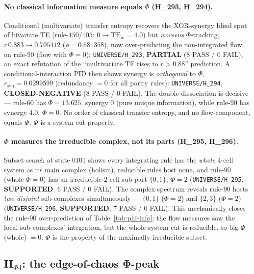 \paragraph{No classical information measure equals $\Phi$ (H\_293, H\_294).}
Conditional (multivariate) transfer entropy recovers the XOR-synergy blind spot of
bivariate TE (rule-$150$/$105$: $0\rightarrow\mathrm{TE_m}{=}4.0$) but \emph{worsens}
$\Phi$-tracking, $r\,0.883\rightarrow0.705412$ ($\rho{=}0.681358$), now over-predicting
the non-integrated flow on rule-$90$ (flow with $\Phi{=}0$): \texttt{UNIVERSE/H\_293},
\textbf{PARTIAL} ($8$ PASS / $0$ FAIL), an exact refutation of the ``multivariate TE
rises to $r{>}0.88$'' prediction. A conditional-interaction PID then shows synergy is
\emph{orthogonal} to $\Phi$, $r_\text{syn}=0.0299599$ (redundancy $=0$ for all parity
rules): \texttt{UNIVERSE/H\_294}, \textbf{CLOSED-NEGATIVE} ($8$ PASS / $0$ FAIL). The
double dissociation is decisive --- rule-$60$ has $\Phi{=}13.625$, synergy $0$ (pure
unique information), while rule-$90$ has synergy $4.0$, $\Phi{=}0$. No order of classical
transfer entropy, and no flow-component, equals $\Phi$: $\Phi$ is a system-cut property.

\paragraph{$\Phi$ measures the irreducible complex, not its parts (H\_295, H\_296).}
\label{app:universe-exclusion}
Subset search at state $0101$ shows every integrating rule has the \emph{whole}
$4$-cell system as its main complex (holism), reducible rules host none, and rule-$90$
(whole-$\Phi{=}0$) has an irreducible $2$-cell sub-part $\{0,1\}$, $\Phi{=}2$
(\texttt{UNIVERSE/H\_295}, \textbf{SUPPORTED}, $6$ PASS / $0$ FAIL). The complex
spectrum reveals rule-$90$ hosts \emph{two disjoint} sub-complexes simultaneously ---
$\{0,1\}$ ($\Phi{=}2$) and $\{2,3\}$ ($\Phi{=}2$) (\texttt{UNIVERSE/H\_296},
\textbf{SUPPORTED}, $7$ PASS / $0$ FAIL). This mechanically closes the rule-$90$
over-prediction of Table~\ref{tab:phi-info}: the flow measures saw the local
sub-complexes' integration, but the whole-system cut is reducible, so big-$\Phi$(whole)
$=0$. $\Phi$ is the property of the maximally-irreducible subset.

\subsection{H$_{\Phi 4}$: the edge-of-chaos Φ-peak}
\label{app:phi-edge}

